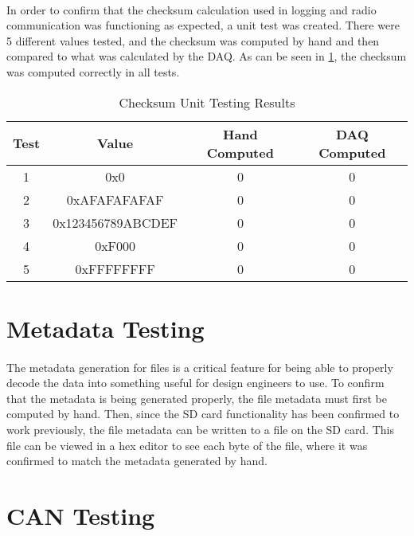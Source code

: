 \paragraph{}
In order to confirm that the checksum calculation used in logging and radio communication was functioning as expected, a unit test was created.
There were 5 different values tested, and the checksum was computed by hand and then compared to what was calculated by the DAQ.
As can be seen in \cref{tab:ChecksumTesting}, the checksum was computed correctly in all tests.

\begin{table}[H] \label{tab:ChecksumTesting}
\caption{Checksum Unit Testing Results}
\centering
\begin{tabular}{c c c c}
\hline\hline
Test & Value & Hand Computed & DAQ Computed \\ [0.5ex]
\hline
1 & 0x0 & 0 & 0 \\
2 & 0xAFAFAFAFAF & 0 & 0 \\
3 & 0x123456789ABCDEF & 0 & 0 \\
4 & 0xF000 & 0 & 0 \\
5 & 0xFFFFFFFF & 0 & 0 \\ [1ex]
\hline
\end{tabular}
\end{table}

\section{Metadata Testing}

\paragraph{}
The metadata generation for files is a critical feature for being able to properly decode the data into something useful for design engineers to use.
To confirm that the metadata is being generated properly, the file metadata must first be computed by hand.
Then, since the SD card functionality has been confirmed to work previously, the file metadata can be written to a file on the SD card.
This file can be viewed in a hex editor to see each byte of the file, where it was confirmed to match the metadata generated by hand.

\section{CAN Testing}

